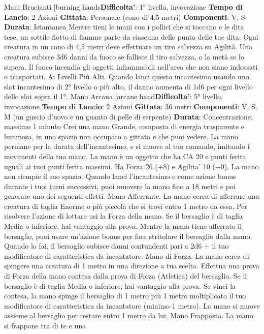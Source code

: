 \begin{multicols}{2}
Mani Brucianti
[burning hands\textbf{Difficolta'}:
1° livello, invocazione
\textbf{Tempo di Lancio}: 2 Azioni
\textbf{Gittata}: Personale (cono di 4,5 metri)
\textbf{Componenti}: V, S
\textbf{Durata}: Istantanea
Mentre tieni le mani con i pollici che si toccano e le dita
tese, un sottile fiotto di fiamme parte da ciascuna delle
punta delle tue dita. Ogni creatura in un cono di 4,5
metri deve effettuare un tiro salvezza su Agilità.
Una creatura subisce 3d6 danni da fuoco se fallisce il
tiro salvezza, o la metà se lo supera.
Il fuoco incendia gli oggetti infiammabili nell’area che
non siano indossati o trasportati.
Ai Livelli Più Alti. Quando lanci questo incantesimo
usando uno slot incantesimo di 2° livello o più alto, il
danno aumenta di 1d6 per ogni livello dello slot sopra il
1°.
Mano Arcana
[arcane hand\textbf{Difficolta'}:
5° livello, invocazione
\textbf{Tempo di Lancio}: 2 Azioni
\textbf{Gittata}: 36 metri
\textbf{Componenti}: V, S, M (un guscio d’uovo e un guanto di
pelle di serpente)
\textbf{Durata}: Concentrazione, massimo 1 minuto
Crei una mano Grande, composta di energia
trasparente e luminosa, in uno spazio non occupato a
gittata e che puoi vedere. La mano permane per la
durata dell’incantesimo, e si muove al tuo comando,
imitando i movimenti della tua mano.
La mano è un oggetto che ha CA 20 e punti ferita uguali
ai tuoi punti ferita massimi. Ha Forza 26 (+8) e
Agilita' 10 (+0). La mano non riempie il suo spazio.
Quando lanci l’incantesimo e come azione bonus
durante i tuoi turni successivi, puoi muovere la mano
fino a 18 metri e poi generare uno dei seguenti effetti.
Mano Afferrante. La mano cerca di afferrare una
creatura di taglia Enorme o più piccola che si trovi entro 
1 metro da essa. Per risolvere l’azione di lottare usi la
Forza della mano. Se il bersaglio è di taglia Media o
inferiore, hai vantaggio alla prova. Mentre la mano tiene
afferrato il bersaglio, puoi usare un’azione bonus per
fare stritolare il bersaglio dalla mano. Quando lo fai, il
bersaglio subisce danni contundenti pari a 2d6 + il tuo
modificatore di caratteristica da incantatore.
Mano di Forza. La mano cerca di spingere una
creatura di 1 metro in una direzione a tua scelta.
Effettua una prova di Forza della mano contesa dalla
prova di Forza (Atletica) del bersaglio. Se il bersaglio è
di taglia Media o inferiore, hai vantaggio alla prova. Se
vinci la contesa, la mano spinge il bersaglio di 1 metro
più 1 metro moltiplicato il tuo modificatore di
caratteristica da incantatore (minimo 1 metro). La
mano si muove assieme al bersaglio per restare entro
1 metro da lui.
Mano Frapposta. La mano si frappone tra di te e una

\end{multicols}
